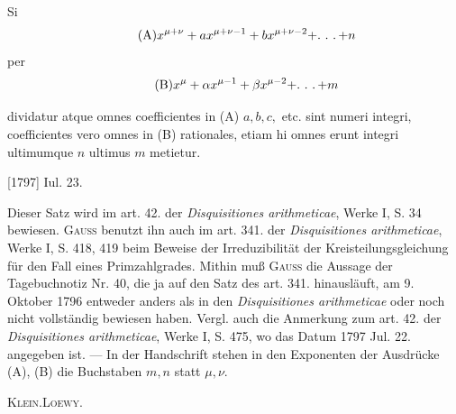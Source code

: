 \indent Si
\begingroup\makeatletter\let\veqno\@@leqno\makeatother
\begin{equation*}\tag*{(A)}
x^{\mu+\nu}+ax^{\mu+\nu-1}+bx^{\mu+\nu-2}+\ldotp\,\ldotp\,\ldotp+n
\end{equation*}
\noindent per
\begin{equation*}\tag*{(B)}
x^\mu+\alpha x^{\mu-1}+\beta x^{\mu-2}+\ldotp\,\ldotp\,\ldotp+m
\end{equation*}
\par\endgroup

\clearpage{}
\noindent dividatur atque omnes coefficientes in (A) \(a,b,c,\) etc. sint numeri integri, coefficientes vero omnes in (B) rationales, etiam hi omnes erunt integri ultimumque \(n\) ultimus \(m\) metietur.
\par\noindent\hfill[1797] Iul. 23.

\medskip\begingroup\small
\indent Dieser Satz wird im art. 42. der \textit{Disquisitiones arithmeticae}, Werke I, S. 34 bewiesen. \textsc{Gauss} benutzt ihn auch im art. 341. der \textit{Disquisitiones arithmeticae}, Werke I, S. 418, 419 beim Beweise der Irreduzibilität der Kreisteilungsgleichung für den Fall eines Primzahlgrades. Mithin muß \textsc{Gauss} die Aussage der Tagebuchnotiz Nr. 40, die ja auf den Satz des art. 341. hinausläuft, am 9. Oktober 1796 entweder anders als in den \textit{Disquisitiones arithmeticae} oder noch nicht vollständig bewiesen haben. Vergl. auch die Anmerkung zum art. 42. der \textit{Disquisitiones arithmeticae}, Werke I, S. 475, wo das Datum 1797 Jul. 22. angegeben ist. — In der Handschrift stehen in den Exponenten der Ausdrücke (A), (B) die Buchstaben \(m,n\) statt \(\mu,\nu\).
\par\noindent\hfill\textsc{Klein.\quad Loewy.}
\par\endgroup

